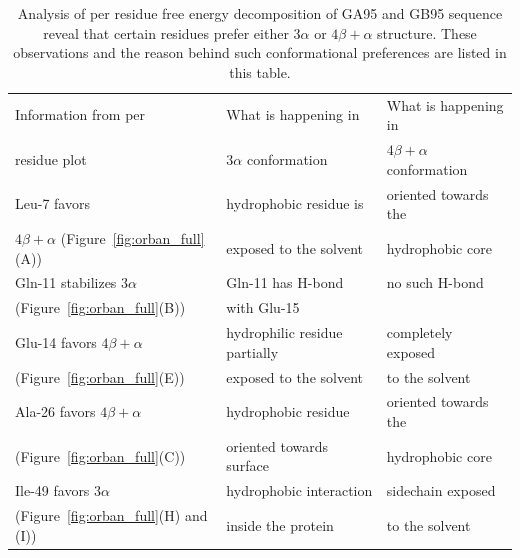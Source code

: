 \documentclass[12pt]{article}
\begin{document}
\begin{table}
\begin{center}
\caption{Analysis of per residue free energy decomposition of GA95 and GB95 sequence reveal that certain residues prefer
either $3 \alpha$  or $4 \beta + \alpha$ structure. These observations and the reason behind such conformational preferences are listed in this
table.}
\label{table:orban_perresidue}
\begin{tabular}{| l | l | l |}
\hline
    Information from per                                 & What is happening in           & What is happening in                      \\ 
    residue plot                                         & $3 \alpha$ conformation        & $4 \beta + \alpha$  conformation          \\ \hline
    Leu-7 favors                                         & hydrophobic residue is         & oriented towards the                      \\ 
    $4 \beta + \alpha$ (Figure~\ref{fig:orban_full}(A))  & exposed to the solvent         & hydrophobic core                          \\ \hline
    Gln-11 stabilizes $3 \alpha$                   & Gln-11 has H-bond                         & no such H-bond                           \\ 
    (Figure~\ref{fig:orban_full}(B))           &  with Glu-15                              &                                           \\ \hline 
    Glu-14 favors $4 \beta + \alpha$           & hydrophilic residue partially  & completely exposed                                    \\       
    (Figure~\ref{fig:orban_full}(E))           & exposed to the solvent         & to the solvent                                        \\ \hline        
    Ala-26 favors  $4 \beta + \alpha$          & hydrophobic residue            & oriented towards the                                   \\ 
     (Figure~\ref{fig:orban_full}(C))          & oriented towards surface       & hydrophobic core                                       \\ \hline
    Ile-49 favors $3 \alpha$                   & hydrophobic interaction        & sidechain exposed                                       \\
    (Figure~\ref{fig:orban_full}(H) and (I))   & inside the protein             & to the solvent                                          \\ \hline 

\end{tabular}
\end{center}
\end{table}
\end{document}
